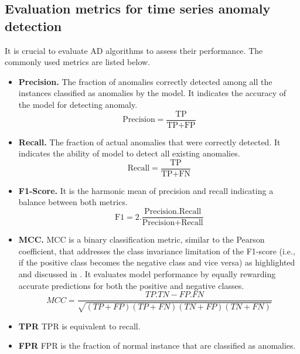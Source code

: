 

\subsection{Evaluation metrics for time series anomaly detection}
It is crucial to evaluate AD algorithms to assess their performance. The commonly used metrics are listed below.

\begin{itemize}
    \item \textbf{Precision.} The fraction of anomalies correctly detected among all the instances classified as anomalies by the model. It indicates the accuracy of the model for detecting anomaly.
    \begin{equation}\label{eq:precision}
        \text{Precision} = \frac{\text{TP}}{\text{TP} + \text{FP}}
    \end{equation}
    \item \textbf{Recall.} The fraction of actual anomalies that were correctly detected. It indicates the ability of model to detect all existing anomalies.
    \begin{equation}\label{eq:recall}
        \text{Recall} = \frac{\text{TP}}{\text{TP} + \text{FN}}
    \end{equation}
    \item \textbf{F1-Score.} It is the harmonic mean of precision and recall indicating a balance between both metrics.
    \begin{equation}\label{eq:f1}
        \text{F1} = 2 . \frac{\text{Precision} . \text{Recall}}{\text{Precision} + \text{Recall}}
    \end{equation}
    \item \textbf{MCC.} \ac{MCC} \cite{Matthews1975ComparisonOT} is a binary classification metric, similar to the Pearson coefficient, that addresses the class invariance limitation of the F1-score (i.e., if the positive class becomes the negative class and vice versa) as highlighted and discussed in  \cite{Chicco2020TheAO}. It evaluates model performance by equally rewarding accurate predictions for both the positive and negative classes.
    \begin{equation}\label{eq:mcc}
        MCC = \frac{TP . TN - FP . FN}{\sqrt{(TP+FP)(TP+FN)(TN+FP)(TN+FN)}}
    \end{equation}
    \item \textbf{TPR} \ac{TPR} is equivalent to recall.
    \item \textbf{FPR} \ac{FPR} is the fraction of normal instance that are classified as anomalies.

\end{itemize}

